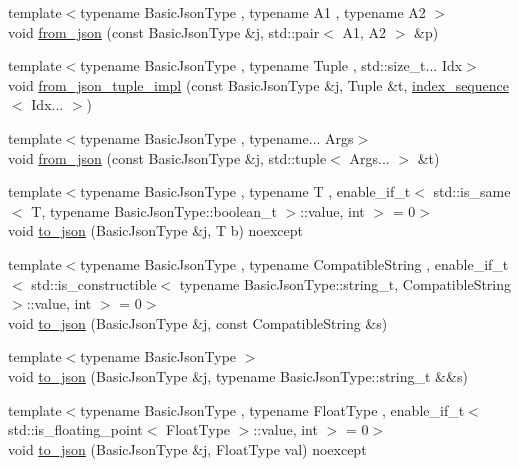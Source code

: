 \begin{DoxyCompactItemize}
\item 
{\footnotesize template$<$typename Basic\+Json\+Type , typename A1 , typename A2 $>$ }\\void \hyperlink{namespacenlohmann_1_1detail_aae9f9c2601074e323d49428132cc293d}{from\+\_\+json} (const Basic\+Json\+Type \&j, std\+::pair$<$ A1, A2 $>$ \&p)
\item 
{\footnotesize template$<$typename Basic\+Json\+Type , typename Tuple , std\+::size\+\_\+t... Idx$>$ }\\void \hyperlink{namespacenlohmann_1_1detail_a28253915d9db4a0112d60eaee0422949}{from\+\_\+json\+\_\+tuple\+\_\+impl} (const Basic\+Json\+Type \&j, Tuple \&t, \hyperlink{structnlohmann_1_1detail_1_1index__sequence}{index\+\_\+sequence}$<$ Idx... $>$)
\item 
{\footnotesize template$<$typename Basic\+Json\+Type , typename... Args$>$ }\\void \hyperlink{namespacenlohmann_1_1detail_a8b99ec9b29f3f20a18fc4281fb784e49}{from\+\_\+json} (const Basic\+Json\+Type \&j, std\+::tuple$<$ Args... $>$ \&t)
\item 
{\footnotesize template$<$typename Basic\+Json\+Type , typename T , enable\+\_\+if\+\_\+t$<$ std\+::is\+\_\+same$<$ T, typename Basic\+Json\+Type\+::boolean\+\_\+t $>$\+::value, int $>$  = 0$>$ }\\void \hyperlink{namespacenlohmann_1_1detail_a1a804b98cbe89b7e44b698f2ca860490}{to\+\_\+json} (Basic\+Json\+Type \&j, T b) noexcept
\item 
{\footnotesize template$<$typename Basic\+Json\+Type , typename Compatible\+String , enable\+\_\+if\+\_\+t$<$ std\+::is\+\_\+constructible$<$ typename Basic\+Json\+Type\+::string\+\_\+t, Compatible\+String $>$\+::value, int $>$  = 0$>$ }\\void \hyperlink{namespacenlohmann_1_1detail_a7356ed05cdbbb080cee80e1211e1c6c9}{to\+\_\+json} (Basic\+Json\+Type \&j, const Compatible\+String \&s)
\item 
{\footnotesize template$<$typename Basic\+Json\+Type $>$ }\\void \hyperlink{namespacenlohmann_1_1detail_a4aa1ca6b7c61bf19d1f30ea5b669f68e}{to\+\_\+json} (Basic\+Json\+Type \&j, typename Basic\+Json\+Type\+::string\+\_\+t \&\&s)
\item 
{\footnotesize template$<$typename Basic\+Json\+Type , typename Float\+Type , enable\+\_\+if\+\_\+t$<$ std\+::is\+\_\+floating\+\_\+point$<$ Float\+Type $>$\+::value, int $>$  = 0$>$ }\\void \hyperlink{namespacenlohmann_1_1detail_a22bffdc8bc7e43af380ba2050696b230}{to\+\_\+json} (Basic\+Json\+Type \&j, Float\+Type val) noexcept

\end{DoxyCompactItemize}

